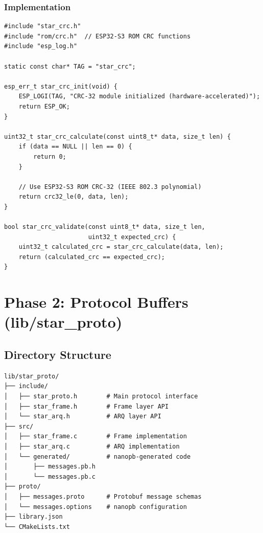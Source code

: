 \subsubsection{Implementation}

\begin{lstlisting}[caption={star\_crc.c - CRC-32 Implementation}]
#include "star_crc.h"
#include "rom/crc.h"  // ESP32-S3 ROM CRC functions
#include "esp_log.h"

static const char* TAG = "star_crc";

esp_err_t star_crc_init(void) {
    ESP_LOGI(TAG, "CRC-32 module initialized (hardware-accelerated)");
    return ESP_OK;
}

uint32_t star_crc_calculate(const uint8_t* data, size_t len) {
    if (data == NULL || len == 0) {
        return 0;
    }

    // Use ESP32-S3 ROM CRC-32 (IEEE 802.3 polynomial)
    return crc32_le(0, data, len);
}

bool star_crc_validate(const uint8_t* data, size_t len,
                       uint32_t expected_crc) {
    uint32_t calculated_crc = star_crc_calculate(data, len);
    return (calculated_crc == expected_crc);
}
\end{lstlisting}

\section{Phase 2: Protocol Buffers (lib/star\_proto)}

\subsection{Directory Structure}

\begin{verbatim}
lib/star_proto/
├── include/
│   ├── star_proto.h        # Main protocol interface
│   ├── star_frame.h        # Frame layer API
│   └── star_arq.h          # ARQ layer API
├── src/
│   ├── star_frame.c        # Frame implementation
│   ├── star_arq.c          # ARQ implementation
│   └── generated/          # nanopb-generated code
│       ├── messages.pb.h
│       └── messages.pb.c
├── proto/
│   ├── messages.proto      # Protobuf message schemas
│   └── messages.options    # nanopb configuration
├── library.json
└── CMakeLists.txt
\end{verbatim}

